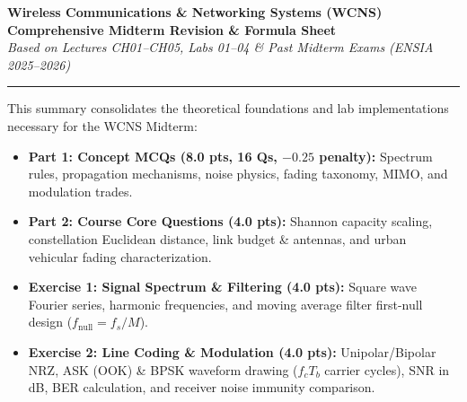 \documentclass[10pt,a4paper]{article}
\begin{document}
\begin{center}
    {\LARGE\bfseries\color{themeblue} Wireless Communications \& Networking Systems (WCNS)}\\[2pt]
    {\large\bfseries\color{themeblue} Comprehensive Midterm Revision \& Formula Sheet}\\[2pt]
    {\small\itshape Based on Lectures CH01--CH05, Labs 01--04 \& Past Midterm Exams (ENSIA 2025--2026)}\\[2pt]
    \textcolor{themeblue}{\rule{\textwidth}{0.6pt}}
\end{center}

\vspace{-8pt}

\begin{tcolorbox}[
    colframe=themeblue,
    colback=lightbg,
    coltitle=white,
    fonttitle=\bfseries\sffamily\small,
    title={Executive Exam Roadmap: High-Yield Topics \& Midterm Structure},
    arc=1.4mm,
    boxrule=0.6pt,
    left=6pt, right=6pt, top=3pt, bottom=3pt
]
\footnotesize
This summary consolidates the theoretical foundations and lab implementations necessary for the WCNS Midterm:
\begin{itemize}[leftmargin=12pt, itemsep=1pt, topsep=1pt]
    \item \textbf{Part 1: Concept MCQs (8.0 pts, 16 Qs, $-0.25$ penalty):} Spectrum rules, propagation mechanisms, noise physics, fading taxonomy, MIMO, and modulation trades.
    \item \textbf{Part 2: Course Core Questions (4.0 pts):} Shannon capacity scaling, constellation Euclidean distance, link budget \& antennas, and urban vehicular fading characterization.
    \item \textbf{Exercise 1: Signal Spectrum \& Filtering (4.0 pts):} Square wave Fourier series, harmonic frequencies, and moving average filter first-null design ($f_{\text{null}} = f_s / M$).
    \item \textbf{Exercise 2: Line Coding \& Modulation (4.0 pts):} Unipolar/Bipolar NRZ, ASK (OOK) \& BPSK waveform drawing ($f_c T_b$ carrier cycles), SNR in dB, BER calculation, and receiver noise immunity comparison.
\end{itemize}
\end{tcolorbox}

\vspace{-2pt}

\par\vspace{2pt}
\end{document}
